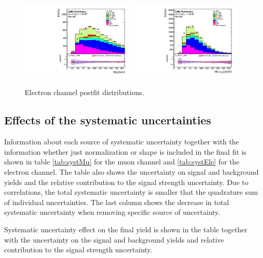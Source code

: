 \begin{figure}[htbp]
		\includegraphics[width=0.48\textwidth]{Figures/Results/Electron/postfit/Wbb_H_mass_doQCD1.pdf}
		\includegraphics[width=0.48\textwidth]{Figures/Results/Electron/postfit/Wbb_max_hJet_pt_doQCD1.pdf}		
	\caption{Electron channel postfit distributions.}
	\label{fig:Wbb_postfit_ele}
\end{figure}

\subsection{Effects of the systematic uncertainties}
\label{sec:systEff}

Information about each source of systematic uncertainty together with the information whether just normalization or shape is included in the final fit is shown in table \ref{tab:systMu} for the muon channel and \ref{tab:systEle} for the electron channel. The table also shows the uncertainty on signal and background yields and the relative contribution to the signal strength uncertainty.
Due to correlations, the total systematic uncertainty is smaller that the quadrature sum of individual uncertainties. The last column shows the decrease in total systematic uncertainty when removing specific source of uncertainty.

\begin{table}
\caption[Systematic uncertainties in the muon channel.]{Systematic uncertainty effect on the final yield is shown in the table together with the uncertainty on the signal and background yields and relative contribution to the signal strength uncertainty. }
\label{tab:systMu}

\end{table}

